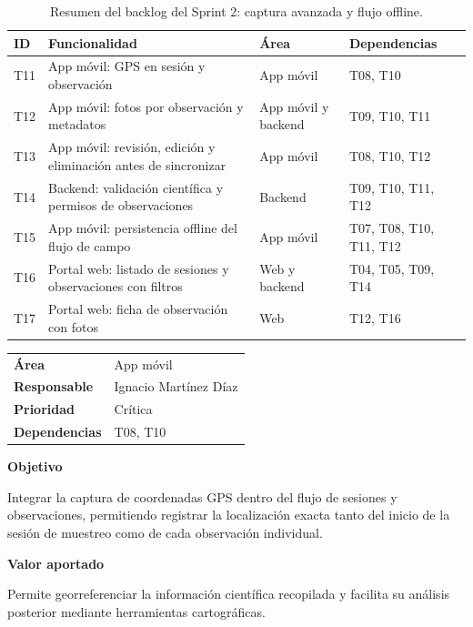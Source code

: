 \begin{table}[H]
  \centering
  \caption{Resumen del backlog del Sprint 2: captura avanzada y flujo offline.}
  \label{tab:backlog_sprint2_resumen}
  \begin{tabularx}{\textwidth}{lXlX}
    \toprule
    \textbf{ID} & \textbf{Funcionalidad} & \textbf{Área} & \textbf{Dependencias} \\
    \midrule
    T11 & App móvil: GPS en sesión y observación & App móvil & T08, T10 \\
    T12 & App móvil: fotos por observación y metadatos & App móvil y backend & T09, T10, T11 \\
    T13 & App móvil: revisión, edición y eliminación antes de sincronizar & App móvil & T08, T10, T12 \\
    T14 & Backend: validación científica y permisos de observaciones & Backend & T09, T10, T11, T12 \\
    T15 & App móvil: persistencia offline del flujo de campo & App móvil & T07, T08, T10, T11, T12 \\
    T16 & Portal web: listado de sesiones y observaciones con filtros & Web y backend & T04, T05, T09, T14 \\
    T17 & Portal web: ficha de observación con fotos & Web & T12, T16 \\
    \bottomrule
  \end{tabularx}
\end{table}

\begin{tcolorbox}[title=T11 -- GPS en sesión y observación,colback=gray!5,colframe=black!70,fonttitle=\bfseries]

\begin{tabularx}{\textwidth}{lX}
\textbf{Área} & App móvil \\
\textbf{Responsable} & Ignacio Martínez Díaz \\
\textbf{Prioridad} & Crítica \\
\textbf{Dependencias} & T08, T10 \\
\end{tabularx}

\vspace{0.2cm}

\textbf{Objetivo}

Integrar la captura de coordenadas GPS dentro del flujo de sesiones y observaciones,
permitiendo registrar la localización exacta tanto del inicio de la sesión de
muestreo como de cada observación individual.

\vspace{0.15cm}

\textbf{Valor aportado}

Permite georreferenciar la información científica recopilada y facilita su análisis
posterior mediante herramientas cartográficas.

\end{tcolorbox}

